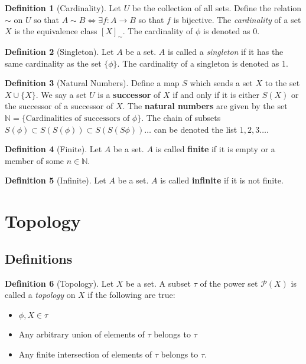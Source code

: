 \documentclass{article}
\theoremstyle{definition}
\newtheorem{definition}{Definition}[subsection]
\theoremstyle{theorem}
\begin{document}
\begin{definition}[Cardinality]
    Let $U$ be the collection of all sets. Define the relation $\sim$ on $U$ so that $A \sim B\iff \exists f:A\rightarrow B$ so that $f$ is bijective. The \textit{cardinality} of a set $X$ is the equivalence class $[X]_\sim$. The cardinality of $\phi$ is denoted as 0.
\end{definition}
\begin{definition}[Singleton]
    Let $A$ be a set. $A$ is called a \textit{singleton} if it has the same cardinality as the set $\{\phi\}$. The cardinality of a singleton is denoted as 1.
\end{definition}
\begin{definition}[Natural Numbers]
    Define a map $S$ which sends a set $X$ to the set $X\cup \{X\}$. We say a set $U$ is a \textbf{successor} of $X$ if and only if it is either $S(X)$ or the successor of a successor of $X$. The \textbf{natural numbers} are given by the set $\mathbb{N} = \{\text{Cardinalities of successors of } \phi\}$. The chain of subsets $S(\phi)\subset S(S(\phi))\subset S(S(S\phi))\ldots$ can be denoted the list $1,2,3\ldots$. 
\end{definition}
\begin{definition}[Finite]
    Let $A$ be a set. $A$ is called \textbf{finite} if it is empty or a member of some $n\in \mathbb{N}$.
\end{definition}
\begin{definition}[Infinite]
    Let $A$ be a set. $A$ is called \textbf{infinite} if it is not finite.
\end{definition}

\newpage


\section{Topology}
\setcounter{subsection}{-1}
\subsection{Definitions}

    \begin{definition}[Topology]\label{sub:topology} Let $X$ be a set. A subset $\tau$ of the power set $\mathcal{P}(X)$ is called a \textit{topology} on $X$ if the following are true:
        \begin{itemize}
            \item $\phi,X \in \tau$
            \item Any arbitrary union of elements of $\tau$ belongs to $\tau$
            \item Any finite intersection of elements of $\tau$ belongs to $\tau$.
        \end{itemize}
    \end{definition}
\end{document}

